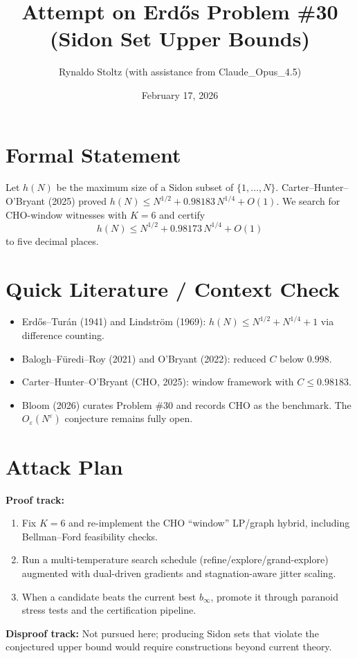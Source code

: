 \documentclass[11pt]{article}
\title{Attempt on Erd\H{o}s Problem \#30 (Sidon Set Upper Bounds)}
\author{Rynaldo Stoltz (with assistance from Claude\_Opus\_4.5)}
\date{February 17, 2026}
\begin{document}
\maketitle

\section*{Formal Statement}
Let $h(N)$ be the maximum size of a Sidon subset of $\{1,\dots,N\}$. Carter--Hunter--O'Bryant (2025) proved $h(N) \le N^{1/2} + 0.98183\,N^{1/4} + O(1)$. We search for CHO-window witnesses with $K=6$ and certify
\[
h(N) \le N^{1/2} + 0.98173\, N^{1/4} + O(1)
\]
to five decimal places.

\section*{Quick Literature / Context Check}
\begin{itemize}
  \item Erd\H{o}s--Tur\'an (1941) and Lindstr\"om (1969): $h(N) \le N^{1/2} + N^{1/4} + 1$ via difference counting.
  \item Balogh--F\"uredi--Roy (2021) and O'Bryant (2022): reduced $C$ below $0.998$.
  \item Carter--Hunter--O'Bryant (CHO, 2025): window framework with $C \le 0.98183$.
  \item Bloom (2026) curates Problem \#30 and records CHO as the benchmark. The $O_\varepsilon(N^\varepsilon)$ conjecture remains fully open.
\end{itemize}

\section*{Attack Plan}
\textbf{Proof track:}
\begin{enumerate}
  \item Fix $K=6$ and re-implement the CHO ``window'' LP/graph hybrid, including Bellman--Ford feasibility checks.
  \item Run a multi-temperature search schedule (refine/explore/grand-explore) augmented with dual-driven gradients and stagnation-aware jitter scaling.
  \item When a candidate beats the current best $b_\infty$, promote it through paranoid stress tests and the certification pipeline.
\end{enumerate}
\textbf{Disproof track:} Not pursued here; producing Sidon sets that violate the conjectured upper bound would require constructions beyond current theory.
\end{document}

